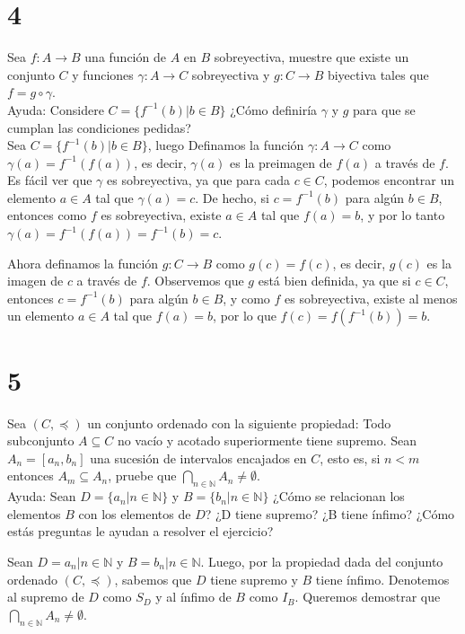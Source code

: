 \documentclass{report}
\begin{document}
        \section*{4}Sea $f: A \rightarrow B$ una función de $A$ en $B$ sobreyectiva, muestre que existe un conjunto $C$ y funciones $\gamma: A \rightarrow C$ sobreyectiva y $g: C \rightarrow B$ biyectiva tales que $f=g \circ \gamma$.\\

        Ayuda: Considere $C=\{f^{-1}(b) | b \in B\}$ ¿Cómo definiría $\gamma$ y $g$ para que se cumplan las condiciones pedidas?\\

        Sea $C=\{f^{-1}(b) | b \in B\}$, luego Definamos la función $\gamma: A \rightarrow C$ como $\gamma(a)=f^{-1}(f(a))$, es decir, $\gamma(a)$ es la preimagen de $f(a)$ a través de $f$. Es fácil ver que $\gamma$ es sobreyectiva, ya que para cada $c \in C$, podemos encontrar un elemento $a \in A$ tal que $\gamma(a)=c$. De hecho, si $c=f^{-1}(b)$ para algún $b \in B$, entonces como $f$ es sobreyectiva, existe $a \in A$ tal que $f(a)=b$, y por lo tanto $\gamma(a)=f^{-1}(f(a))=f^{-1}(b)=c$.

        Ahora definamos la función $g: C \rightarrow B$ como $g(c)=f(c)$, es decir, $g(c)$ es la imagen de $c$ a través de $f$. Observemos que $g$ está bien definida, ya que si $c \in C$, entonces $c=f^{-1}(b)$ para algún $b \in B$, y como $f$ es sobreyectiva, existe al menos un elemento $a \in A$ tal que $f(a)=b$, por lo que $f(c)=f(f^{-1}(b))=b$.
        \section*{5}Sea $(C, \preceq)$ un conjunto ordenado con la siguiente propiedad: Todo subconjunto $A \subseteq C$ no vacío y acotado superiormente tiene supremo. Sean $A_n=[a_n, b_n]$ una sucesión de intervalos encajados en $C$, esto es, si $n<m$ entonces $A_m \subseteq A_n$, pruebe que $\bigcap_{n \in \mathbb{N}} A_n \neq \emptyset$.\\
        Ayuda: Sean $D=\{a_n | n \in \mathbb{N}\}$ y $B=\{b_n | n \in \mathbb{N}\}$ ¿Cómo se relacionan los elementos $B$ con los elementos de $D$? ¿D tiene supremo? ¿B tiene ínfimo? ¿Cómo estás preguntas le ayudan a resolver el ejercicio?

            Sean $D = { a_n | n \in \mathbb{N}}$ y $B = { b_n | n \in \mathbb{N}}$. Luego, por la propiedad dada del conjunto ordenado $(C, \preceq)$, sabemos que $D$ tiene supremo y $B$ tiene ínfimo. Denotemos al supremo de $D$ como $S_D$ y al ínfimo de $B$ como $I_B$. Queremos demostrar que $\bigcap_{n \in \mathbb{N}} A_n \neq \emptyset$.
\end{document}

